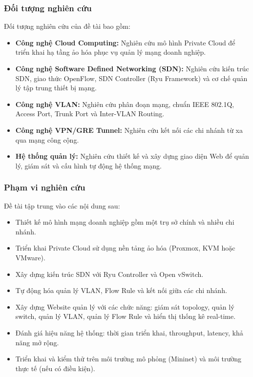 \subsubsection{Đối tượng nghiên cứu}
Đối tượng nghiên cứu của đề tài bao gồm:
\begin{itemize}
    \item \textbf{Công nghệ Cloud Computing:} Nghiên cứu mô hình Private Cloud để triển khai hạ tầng ảo hóa phục vụ quản lý mạng doanh nghiệp.
    \item \textbf{Công nghệ Software Defined Networking (SDN):} Nghiên cứu kiến trúc SDN, giao thức OpenFlow, SDN Controller (Ryu Framework) và cơ chế quản lý tập trung thiết bị mạng.
    \item \textbf{Công nghệ VLAN:} Nghiên cứu phân đoạn mạng, chuẩn IEEE 802.1Q, Access Port, Trunk Port và Inter-VLAN Routing.
    \item \textbf{Công nghệ VPN/GRE Tunnel:} Nghiên cứu kết nối các chi nhánh từ xa qua mạng công cộng.
    \item \textbf{Hệ thống quản lý:} Nghiên cứu thiết kế và xây dựng giao diện Web để quản lý, giám sát và cấu hình tự động hệ thống mạng.
\end{itemize}

\subsubsection{Phạm vi nghiên cứu}
Đề tài tập trung vào các nội dung sau:
\begin{itemize}
    \item Thiết kế mô hình mạng doanh nghiệp gồm một trụ sở chính và nhiều chi nhánh.
    \item Triển khai Private Cloud sử dụng nền tảng ảo hóa (Proxmox, KVM hoặc VMware).
    \item Xây dựng kiến trúc SDN với Ryu Controller và Open vSwitch.
    \item Tự động hóa quản lý VLAN, Flow Rule và kết nối giữa các chi nhánh.
    \item Xây dựng Website quản lý với các chức năng: giám sát topology, quản lý switch, quản lý VLAN, quản lý Flow Rule và hiển thị thống kê real-time.
    \item Đánh giá hiệu năng hệ thống: thời gian triển khai, throughput, latency, khả năng mở rộng.
    \item Triển khai và kiểm thử trên môi trường mô phỏng (Mininet) và môi trường thực tế (nếu có điều kiện).
\end{itemize}

